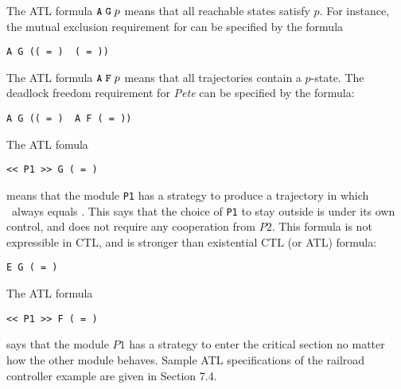 The ATL formula ${\tt A}\;{\tt G}\;p$ means that all reachable
states satisfy $p$. For instance, the mutual exclusion requirement
for \Pete can be specified by the formula

\begin{center}
\tt A G \NOT((\statuso\ = \incs) \AND\ (\statust\ = \incs))
\end{center}

\mypar
The ATL formula ${\tt A}\;{\tt F}\;p$ means that all trajectories
contain a $p$-state. The deadlock freedom requirement for {\em Pete}
can be specified by the formula:

\begin{center}
\tt A G ((\statuso\ = \reqcs) \IMPLY\ A F (\statuso\ = \incs))
\end{center}

\mypar
The ATL fomula

\begin{center}
\tt {\tt <<} P1 {\tt >>} G (\statuso\ = \outcs)
\end{center}

\mypar
means that the module {\tt P1} has a strategy to produce a trajectory
in which \statuso\ always equals \outcs. This says that
the choice of {\tt P1} to stay outside is under its own control,
and does not require any cooperation from $P2$. This formula
is not expressible in CTL, and is stronger than existential
CTL (or ATL) formula:

\begin{center}
\tt E G (\statuso\ = \outcs)
\end{center}

\mypar
The ATL formula

\begin{center}
\tt {\tt <<} P1 {\tt >>} F (\statuso\ = \incs)
\end{center}

\mypar
says that the module $P1$ has a strategy to enter the critical section
no matter how the other module behaves.
Sample ATL specifications of the railroad controller example
are given in Section 7.4.



